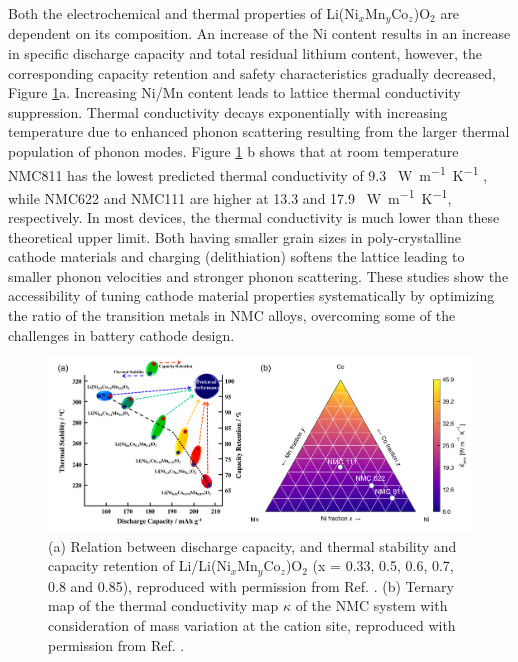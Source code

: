 \documentclass[journal=jacsat,manuscript=article]{achemso}
\begin{document}
Both the electrochemical and thermal properties of Li(Ni$_x$Mn$_y$Co$_z$)O$_2$ are dependent on its composition. 
An increase of the Ni content results in an increase in speciﬁc discharge capacity and total residual lithium content, however, the corresponding capacity retention and safety characteristics gradually decreased, Figure \ref{figure_thermal}a. \cite{noh2013comparison} 
Increasing Ni/Mn content leads to lattice thermal conductivity suppression.\cite{yang2020chemical}
Thermal conductivity decays exponentially with increasing temperature due to enhanced phonon scattering resulting from the larger thermal population of phonon modes.
Figure \ref{figure_thermal} b shows that at room temperature NMC811 has the lowest predicted thermal conductivity of 9.3 \SI{}{W.m^{-1}.K^{-1}} , while NMC622 and NMC111 are higher at 13.3 and 17.9 \SI{}{W.m^{-1}.K^{-1}}, respectively.
In most devices, the thermal conductivity is much lower than these theoretical upper limit.\cite{takahata2002thermal,chen2006thermal}
Both having smaller grain sizes in poly-crystalline cathode materials and charging (delithiation) softens the lattice leading to smaller phonon velocities and stronger phonon scattering. \cite{feng2020quantum,xia2020high}
These studies show the accessibility of tuning cathode material properties systematically by optimizing the ratio of the transition metals in NMC alloys, overcoming some of the challenges in battery cathode design.

\begin{figure}[]
  \centering
    \includegraphics[width=16cm]{Figures/P_thermal.png}
    \caption{(a) Relation between discharge capacity, and thermal stability and capacity retention of Li/Li(Ni$_x$Mn$_y$Co$_z$)O$_2$ (x = 0.33, 0.5, 0.6, 0.7, 0.8 and 0.85), reproduced with permission from Ref. . (b) Ternary map of the thermal conductivity map $\kappa$ of the NMC system with consideration of mass variation at the cation site, reproduced with permission from Ref. .}
  \label{figure_thermal}
\end{figure}
\end{document}
